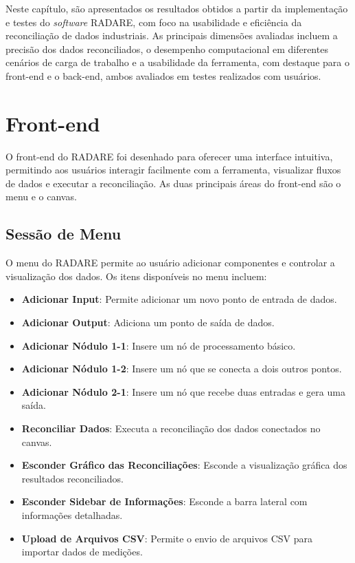 \label{Cap:Resultados}

Neste capítulo, são apresentados os resultados obtidos a partir da implementação e testes do \textit{software} RADARE, com foco na usabilidade e eficiência da reconciliação de dados industriais. As principais dimensões avaliadas incluem a precisão dos dados reconciliados, o desempenho computacional em diferentes cenários de carga de trabalho e a usabilidade da ferramenta, com destaque para o front-end e o back-end, ambos avaliados em testes realizados com usuários.

\section{Front-end}

O front-end do RADARE foi desenhado para oferecer uma interface intuitiva, permitindo aos usuários interagir facilmente com a ferramenta, visualizar fluxos de dados e executar a reconciliação. As duas principais áreas do front-end são o menu e o canvas.

\subsection{Sessão de Menu}

O menu do RADARE permite ao usuário adicionar componentes e controlar a visualização dos dados. Os itens disponíveis no menu incluem:

\begin{itemize}
    \item \textbf{Adicionar Input}: Permite adicionar um novo ponto de entrada de dados.
    \item \textbf{Adicionar Output}: Adiciona um ponto de saída de dados.
    \item \textbf{Adicionar Nódulo 1-1}: Insere um nó de processamento básico.
    \item \textbf{Adicionar Nódulo 1-2}: Insere um nó que se conecta a dois outros pontos.
    \item \textbf{Adicionar Nódulo 2-1}: Insere um nó que recebe duas entradas e gera uma saída.
    \item \textbf{Reconciliar Dados}: Executa a reconciliação dos dados conectados no canvas.
    \item \textbf{Esconder Gráfico das Reconciliações}: Esconde a visualização gráfica dos resultados reconciliados.
    \item \textbf{Esconder Sidebar de Informações}: Esconde a barra lateral com informações detalhadas.
    \item \textbf{Upload de Arquivos CSV}: Permite o envio de arquivos CSV para importar dados de medições.
\end{itemize}


